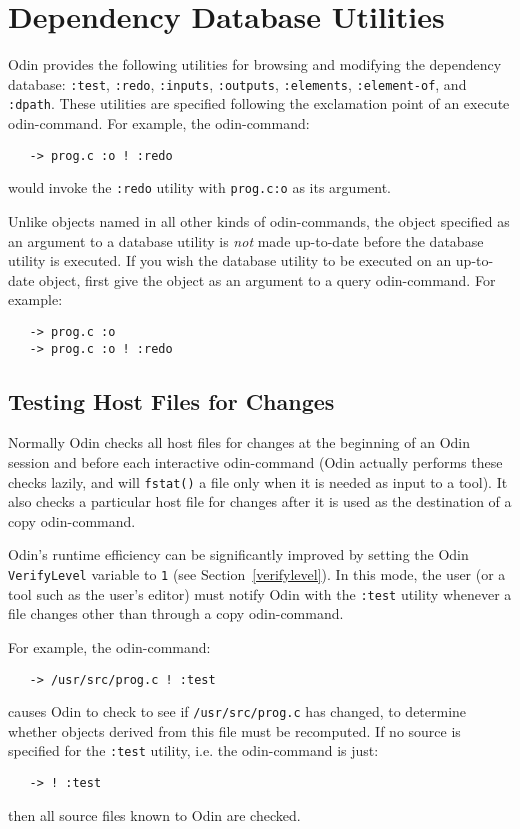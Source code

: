 \documentclass[hidelinks]{report}
\newcommand{\ex}{\tt}   %
\begin{document}
\appendix


\chapter{Dependency Database Utilities}

Odin provides the following utilities for browsing and
modifying the dependency database:
{\ex :test}, {\ex :redo}, {\ex :inputs}, {\ex :outputs},
{\ex :elements}, {\ex :element-of}, and {\ex :dpath}.
These utilities are specified
following the exclamation point of an execute odin-command.
For example, the odin-command:
\begin{verbatim}
   -> prog.c :o ! :redo
\end{verbatim}
would invoke the {\ex :redo} utility with {\ex prog.c:o}
as its argument.

Unlike objects named in all other kinds of odin-commands,
the object specified as an argument to a database utility
is {\em not} made up-to-date before the database utility is executed.
If you wish the database utility to be executed on an up-to-date object,
first give the object as an argument to a query odin-command.
For example:
\begin{verbatim}
   -> prog.c :o
   -> prog.c :o ! :redo
\end{verbatim}

\section{Testing Host Files for Changes}

Normally Odin checks all host files for changes
at the beginning of an Odin session and before each interactive
odin-command (Odin actually performs these checks lazily,
and will {\ex fstat()} a file only when it is needed
as input to a tool).
It also checks a particular host file for changes after
it is used as the destination of a copy odin-command.

Odin's runtime efficiency can be significantly improved by setting
the Odin {\ex VerifyLevel} variable to {\ex 1}
(see Section~\ref{verifylevel}).
In this mode, the user (or a tool such as the user's editor)
must notify Odin with the {\ex :test} utility
whenever a file changes other than through a copy odin-command.

For example, the odin-command:
\begin{verbatim}
   -> /usr/src/prog.c ! :test
\end{verbatim}
causes Odin to check to see if {\ex /usr/src/prog.c} has changed,
to determine whether objects derived from this file must be recomputed.
If no source is specified for the {\ex :test} utility,
i.e. the odin-command is just:
\begin{verbatim}
   -> ! :test
\end{verbatim}
then all source files known to Odin are checked.
\end{document}
